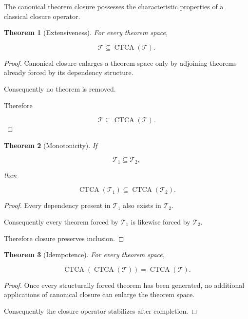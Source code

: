 \documentclass[13pt,openany]{book}
\theoremstyle{plain}
\newtheorem{theorem}{Theorem}[chapter]
\theoremstyle{definition}
\begin{document}
The canonical theorem closure possesses the characteristic properties of a
classical closure operator.

\begin{theorem}[Extensiveness]
For every theorem space,

\[
\mathcal T
\subseteq
\operatorname{CTCA}(\mathcal T).
\]
\end{theorem}

\begin{proof}

Canonical closure enlarges a theorem space only by adjoining theorems already
forced by its dependency structure.

Consequently no theorem is removed.

Therefore

\[
\mathcal T
\subseteq
\operatorname{CTCA}(\mathcal T).
\]

\end{proof}

\begin{theorem}[Monotonicity]

If

\[
\mathcal T_1
\subseteq
\mathcal T_2,
\]

then

\[
\operatorname{CTCA}(\mathcal T_1)
\subseteq
\operatorname{CTCA}(\mathcal T_2).
\]

\end{theorem}

\begin{proof}

Every dependency present in
\(\mathcal T_1\)
also exists in
\(\mathcal T_2\).

Consequently every theorem forced by
\(\mathcal T_1\)
is likewise forced by
\(\mathcal T_2\).

Therefore closure preserves inclusion.

\end{proof}

\begin{theorem}[Idempotence]

For every theorem space,

\[
\operatorname{CTCA}
(
\operatorname{CTCA}
(\mathcal T)
)
=
\operatorname{CTCA}
(\mathcal T).
\]

\end{theorem}

\begin{proof}

Once every structurally forced theorem has been generated, no additional
applications of canonical closure can enlarge the theorem space.

Consequently the closure operator stabilizes after completion.

\end{proof}
\end{document}
